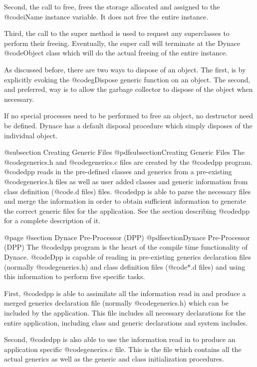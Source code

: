 Second, the call to free, frees the storage allocated and assigned to
the @code{iName} instance variable.  It does not free the entire
instance.

Third, the call to the super method is used to request any
superclasses to perform their freeing.  Eventually, the super call will
terminate at the Dynace @code{Object} class which will do the actual
freeing of the entire instance.

As discussed before, there are two ways to dispose of an object.  The
first, is by explicitly evoking the @code{gDispose} generic function on
an object.  The second, and preferred, way is to allow the garbage
collector to dispose of the object when necessary.

If no special processes need to be performed to free an object, no
destructor need be defined.  Dynace has a default disposal procedure
which simply disposes of the individual object.


@subsection Creating Generic Files
@pdfsubsection{Creating Generic Files}
The @code{generics.h} and @code{generics.c} files are created by the
@code{dpp} program.  @code{dpp} reads in the pre-defined classes and
generics from a pre-existing @code{generics.h} files as well as user
added classes and generic information from class definition (@code{.d}
files) files.  @code{dpp} is able to parse the necessary files and merge
the information in order to obtain sufficient information to generate
the correct generic files for the application.   See the section describing
@code{dpp} for a complete description of it.


@page
@section Dynace Pre-Processor (DPP)
@pdfsection{Dynace Pre-Processor (DPP)}
The @code{dpp} program is the heart of the compile time functionality of
Dynace.  @code{Dpp} is capable of reading in pre-existing generics
declaration files (normally @code{generics.h}) and class
definition files (@code{*.d} files) and using this information to
perform five specific tasks.

First, @code{dpp} is able to assimilate all the information read
in and produce a merged generics declaration file (normally
@code{generics.h}) which can be included by the application.
This file includes all necessary declarations for the entire application,
including class and generic declarations and system includes.

Second, @code{dpp} is also able to use the information read in
to produce an application specific @code{generics.c} file.
This is the file which contains all the actual generics as well
as the generic and class initialization procedures.

